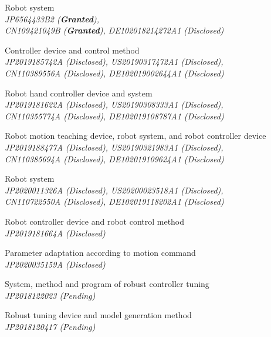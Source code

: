 \documentclass[UTF8,fontset=none]{res}
\begin{document}
\begin{resume}
\begin{etaremune}
	\item Robot system {\it \\JP6564433B2 ({\bf Granted}),\\CN109421049B ({\bf Granted}), DE102018214272A1 (Disclosed)}%
	\item Controller device and control method {\it \\JP2019185742A (Disclosed), US20190317472A1 (Disclosed),\\CN110389556A (Disclosed), DE102019002644A1 (Disclosed)}
	\item Robot hand controller device and system {\it \\JP2019181622A (Disclosed), US20190308333A1 (Disclosed),\\CN110355774A (Disclosed), DE102019108787A1 (Disclosed)}
	\item Robot motion teaching device, robot system, and robot controller device {\it \\JP2019188477A (Disclosed), US20190321983A1 (Disclosed),\\CN110385694A (Disclosed), DE102019109624A1 (Disclosed)}
	\item Robot system {\it \\JP2020011326A (Disclosed), US20200023518A1 (Disclosed),\\CN110722550A (Disclosed), DE102019118202A1 (Disclosed)}
	\item Robot controller device and robot control method {\it \\JP2019181664A (Disclosed)}
	\item Parameter adaptation according to motion command {\it \\JP2020035159A (Disclosed)}
	\item System, method and program of robust controller tuning {\it \\JP2018122023 (Pending)}
	\item Robust tuning device and model generation method {\it \\JP2018120417 (Pending)}
\end{etaremune}


\end{resume}
\end{document}
